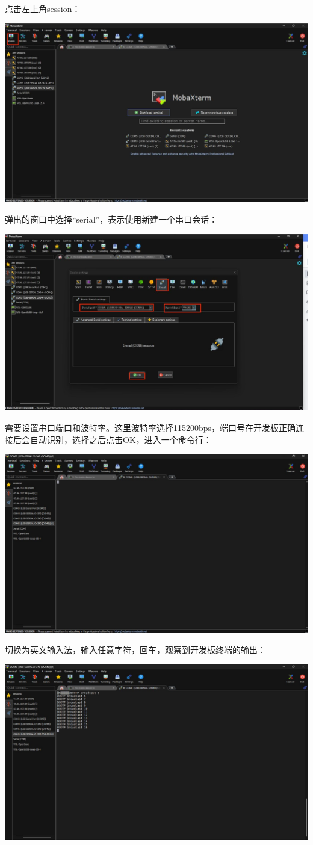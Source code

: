 {\begin{enumerate}
	点击左上角session：
	
	\centering
	\includegraphics[width=0.58\linewidth]{figures/08-02-session.jpg}
	\raggedright
	
	弹出的窗口中选择“serial”，表示使用新建一个串口会话：
	
	\centering
	\includegraphics[width=0.58\linewidth]{figures/08-02-串口设置.jpg}
	\raggedright
	
	
	需要设置串口端口和波特率。这里波特率选择115200bps，端口号在开发板正确连接后会自动识别，选择之后点击OK，进入一个命令行：
	
	\centering
	\includegraphics[width=0.58\linewidth]{figures/08-02-串口命令行.jpg}
	\raggedright
	
	切换为英文输入法，输入任意字符，回车，观察到开发板终端的输出：
	
	\centering
	\includegraphics[width=0.58\linewidth]{figures/08-02-串口输出.jpg}
	\raggedright
	

\end{enumerate}}
